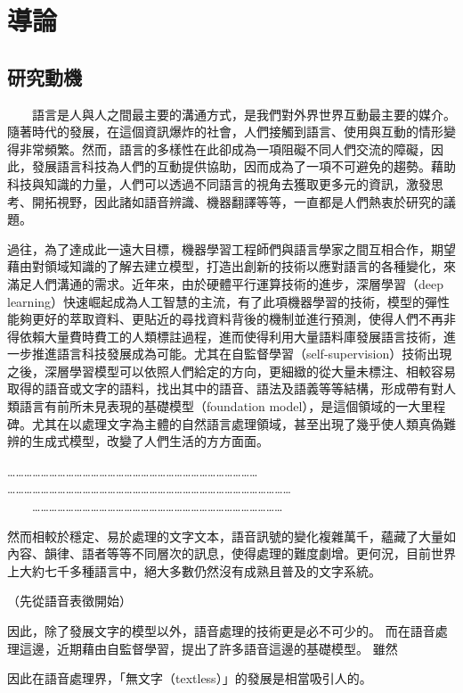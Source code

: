 \chapter{導論}
\section{研究動機}

　　語言是人與人之間最主要的溝通方式，是我們對外界世界互動最主要的媒介。隨著時代的發展，在這個資訊爆炸的社會，人們接觸到語言、使用與互動的情形變得非常頻繁。然而，語言的多樣性在此卻成為一項阻礙不同人們交流的障礙，因此，發展語言科技為人們的互動提供協助，因而成為了一項不可避免的趨勢。藉助科技與知識的力量，人們可以透過不同語言的視角去獲取更多元的資訊，激發思考、開拓視野，因此諸如語音辨識、機器翻譯等等，一直都是人們熱衷於研究的議題。

    過往，為了達成此一遠大目標，機器學習工程師們與語言學家之間互相合作，期望藉由對領域知識的了解去建立模型，打造出創新的技術以應對語言的各種變化，來滿足人們溝通的需求。近年來，由於硬體平行運算技術的進步，深層學習（deep learning）快速崛起成為人工智慧的主流，有了此項機器學習的技術，模型的彈性能夠更好的萃取資料、更貼近的尋找資料背後的機制並進行預測，使得人們不再非得依賴大量費時費工的人類標註過程，進而使得利用大量語料庫發展語言技術，進一步推進語言科技發展成為可能。尤其在自監督學習（self-supervision）技術出現之後，深層學習模型可以依照人們給定的方向，更細緻的從大量未標注、相較容易取得的語音或文字的語料，找出其中的語音、語法及語義等等結構，形成帶有對人類語言有前所未見表現的基礎模型（foundation model），是這個領域的一大里程碑。尤其在以處理文字為主體的自然語言處理領域，甚至出現了幾乎使人類真偽難辨的生成式模型，改變了人們生活的方方面面。

    ……………………………………………………………………………… \\
    ………………………………………………………………………………………… \\
　　………………………………………………………………………………

    然而相較於穩定、易於處理的文字文本，語音訊號的變化複雜萬千，蘊藏了大量如內容、韻律、語者等等不同層次的訊息，使得處理的難度劇增。更何況，目前世界上大約七千多種語言中，絕大多數仍然沒有成熟且普及的文字系統。

    （先從語音表徵開始）

    因此，除了發展文字的模型以外，語音處理的技術更是必不可少的。
而在語音處理這邊，近期藉由自監督學習，提出了許多語音這邊的基礎模型。
雖然

    因此在語音處理界，「無文字（textless）」的發展是相當吸引人的。

